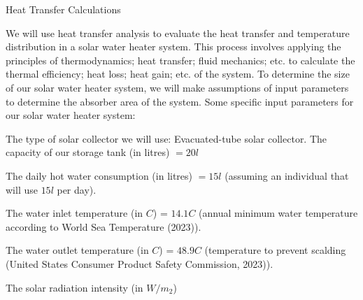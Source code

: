 \documentclass[11pt]{article}
\begin{document}
Heat Transfer Calculations

We will use heat transfer analysis to evaluate the heat transfer and temperature distribution in
a solar water heater system. This process involves applying the principles of
thermodynamics; heat transfer; fluid mechanics; etc. to calculate the thermal efficiency; heat
loss; heat gain; etc. of the system. To determine the size of our solar water heater system, we
will make assumptions of input parameters to determine the absorber area of the system.
Some specific input parameters for our solar water heater system:

The type of solar collector we will use: Evacuated-tube solar collector.
The capacity of our storage tank (in litres) $= 20 l$

The daily hot water consumption (in litres) $= 15 l$ (assuming an individual that will
use $15 l$ per day).

The water inlet temperature (in $C$) = $14.1C$ (annual minimum water temperature
according to World Sea Temperature (2023)).

The water outlet temperature (in $C$) = $48.9C$ (temperature to prevent scalding
(United States Consumer Product Safety Commission, 2023)).

The solar radiation intensity (in $W/m_2$) 
\end{document}
